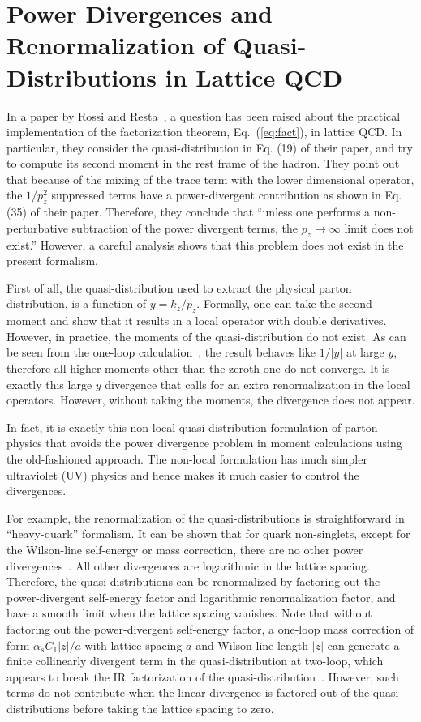 \section{Power Divergences and Renormalization of Quasi-Distributions in Lattice QCD}

In a paper by Rossi and Resta~\cite{Rossi:2017muf}, a question has been raised about the practical implementation
of the factorization theorem, Eq.~(\ref{eq:fact}), in lattice QCD. In particular, they consider
the quasi-distribution in Eq. (19) of their paper, and try to
compute its second moment in the rest frame of the hadron. They point out that
because of the mixing of the trace term with the lower dimensional operator, the
$1/p_z^2$ suppressed terms have a power-divergent contribution as shown in Eq. (35) of their paper.
Therefore, they conclude that ``unless one performs a non-perturbative subtraction of
the power divergent terms, the $p_z\rightarrow \infty$ limit does not exist.''
However, a careful analysis shows that this problem does not exist in the present formalism.

First of all, the quasi-distribution used to extract the physical
parton distribution, is a function of $y=k_z/p_z$. Formally, one can take the second
moment and show that it results in a local operator with double derivatives.
However, in practice, the moments of the quasi-distribution do not exist. As can be seen from the one-loop calculation~\cite{Xiong:2013bka},
the result behaves like $1/|y|$ at large $y$, therefore all higher
moments other than the zeroth one do not converge.
It is exactly this large $y$ divergence that calls for an extra renormalization
in the local operators. However, without taking the moments, the divergence
does not appear.

In fact, it is exactly this non-local quasi-distribution formulation of parton physics that
avoids the power divergence problem in moment calculations using the old-fashioned
approach. The non-local formulation has much simpler ultraviolet (UV) physics
and hence makes it much easier to control the divergences.

For example, the renormalization of the quasi-distributions is straightforward in ``heavy-quark'' formalism. It can be shown
that for quark non-singlets, except for the Wilson-line self-energy or mass correction,
there are no other power divergences~\cite{Ishikawa:2016znu,Chen:2016fxx,Ji:2017oey,Ishikawa:2017faj,Green:2017xeu}. All other divergences are logarithmic
in the lattice spacing. Therefore, the quasi-distributions can be
renormalized by factoring out the power-divergent self-energy factor and logarithmic
renormalization factor, and have a smooth limit when the lattice spacing vanishes.
Note that without factoring out the power-divergent self-energy factor,
a one-loop mass correction of form $\alpha_s C_1|z|/a$ with lattice spacing $a$
and Wilson-line length $|z|$ can generate a finite collinearly divergent term
in the quasi-distribution at two-loop, which appears to break the IR factorization
of the quasi-distribution~\cite{Li:2016amo}. However, such terms do not
contribute when the linear divergence is factored out of the quasi-distributions before taking
the lattice spacing to zero.

